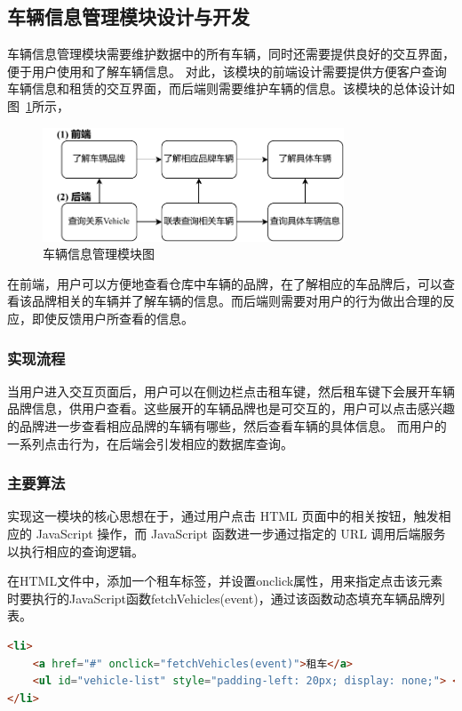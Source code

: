 \documentclass[UTF8,a4paper,12pt]{ctexart}
\begin{document}
\subsection{车辆信息管理模块设计与开发}
车辆信息管理模块需要维护数据中的所有车辆，同时还需要提供良好的交互界面，便于用户使用和了解车辆信息。
对此，该模块的前端设计需要提供方便客户查询车辆信息和租赁的交互界面，而后端则需要维护车辆的信息。该模块的总体设计如图~\ref{fig:carman}所示，
\begin{figure}[htbp]  %
    \centering  %
    \includegraphics[width=0.8\textwidth]{pic/carman.pdf}
    \caption{车辆信息管理模块图}  %
    \label{fig:carman}  %
\end{figure}
在前端，用户可以方便地查看仓库中车辆的品牌，在了解相应的车品牌后，可以查看该品牌相关的车辆并了解车辆的信息。而后端则需要对用户的行为做出合理的反应，即使反馈用户所查看的信息。

\subsubsection{实现流程}
当用户进入交互页面后，用户可以在侧边栏点击租车键，然后租车键下会展开车辆品牌信息，供用户查看。这些展开的车辆品牌也是可交互的，用户可以点击感兴趣的品牌进一步查看相应品牌的车辆有哪些，然后查看车辆的具体信息。
而用户的一系列点击行为，在后端会引发相应的数据库查询。

\subsubsection{主要算法}
实现这一模块的核心思想在于，通过用户点击 HTML 页面中的相关按钮，触发相应的 JavaScript 操作，而 JavaScript 函数进一步通过指定的 URL 调用后端服务以执行相应的查询逻辑。

在HTML文件中，添加一个租车标签，并设置onclick属性，用来指定点击该元素时要执行的JavaScript函数fetchVehicles(event)，通过该函数动态填充车辆品牌列表。
\begin{lstlisting}[language=HTML]
<li>
    <a href="#" onclick="fetchVehicles(event)">租车</a>
    <ul id="vehicle-list" style="padding-left: 20px; display: none;"> </ul>
</li>
\end{lstlisting}
\end{document}
